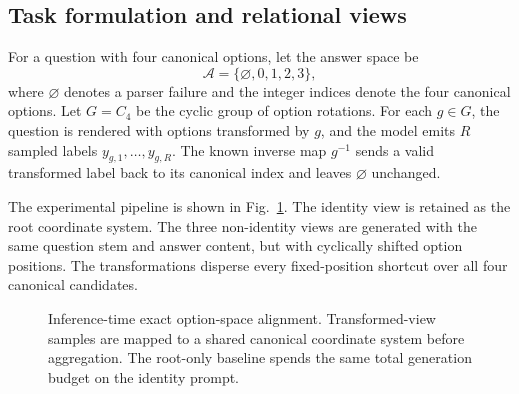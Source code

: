 \documentclass[11pt]{article}
\begin{document}
\subsection{Task formulation and relational views}

For a question with four canonical options, let the answer space be
\[
    \mathcal{A}=\{\varnothing,0,1,2,3\},
\]
where $\varnothing$ denotes a parser failure and the integer indices denote the four canonical options. Let $G=C_4$ be the cyclic group of option rotations. For each $g\in G$, the question is rendered with options transformed by $g$, and the model emits $R$ sampled labels $y_{g,1},\ldots,y_{g,R}$. The known inverse map $g^{-1}$ sends a valid transformed label back to its canonical index and leaves $\varnothing$ unchanged.

The experimental pipeline is shown in Fig.~\ref{fig:pipeline}. The identity view is retained as the root coordinate system. The three non-identity views are generated with the same question stem and answer content, but with cyclically shifted option positions. The transformations disperse every fixed-position shortcut over all four canonical candidates.

\begin{figure}[t]
\centering
{}
\caption{Inference-time exact option-space alignment. Transformed-view samples are mapped to a shared canonical coordinate system before aggregation. The root-only baseline spends the same total generation budget on the identity prompt.}
\label{fig:pipeline}
\end{figure}
\end{document}
